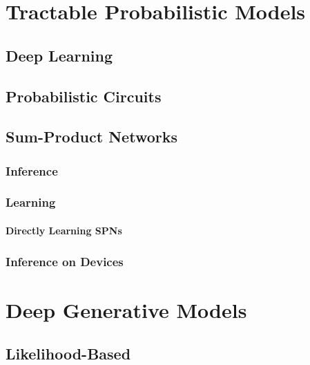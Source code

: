 \chapter{Tractable Probabilistic Models} %

	\section{Deep Learning} %

	\section{Probabilistic Circuits} %

	\section{Sum-Product Networks} %

		\subsection{Inference} %

		\subsection{Learning} %

			\subsubsection{Directly Learning SPNs} %

		\subsection{Inference on Devices} %

\chapter{Deep Generative Models} %

	\section{Likelihood-Based} %

